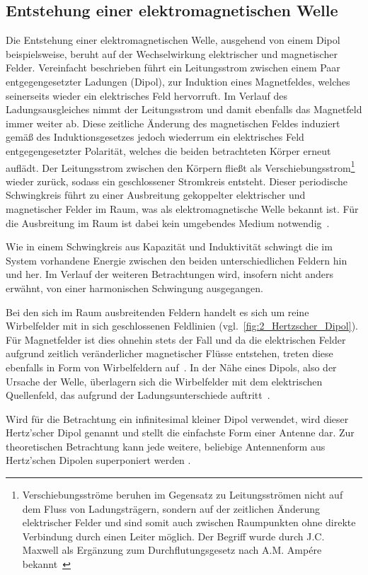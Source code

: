 
\subsection{Entstehung einer elektromagnetischen Welle}\label{cha:2_sub_Entstehung_einer_Welle}

Die Entstehung einer elektromagnetischen Welle, ausgehend von einem Dipol beispielsweise, beruht auf der Wechselwirkung elektrischer und magnetischer Felder. Vereinfacht beschrieben führt ein Leitungsstrom zwischen einem Paar entgegengesetzter Ladungen (Dipol), zur Induktion eines Magnetfeldes, welches seinerseits wieder ein elektrisches Feld hervorruft. Im Verlauf des Ladungsausgleiches nimmt der Leitungsstrom und damit ebenfalls das Magnetfeld immer weiter ab. Diese zeitliche Änderung des magnetischen Feldes induziert gemäß des Induktionsgesetzes jedoch wiederrum ein elektrisches Feld entgegengesetzter Polarität, welches die beiden betrachteten Körper erneut auflädt. Der Leitungsstrom zwischen den Körpern fließt als Verschiebungsstrom\footnote{Verschiebungsströme beruhen im Gegensatz zu Leitungsströmen nicht auf dem Fluss von Ladungsträgern, sondern auf der zeitlichen Änderung elektrischer Felder und sind somit auch zwischen Raumpunkten ohne direkte Verbindung durch einen Leiter möglich. Der Begriff wurde durch J.C. Maxwell als Ergänzung zum Durchflutungsgesetz nach A.M. Ampére bekannt~\cite{Feldtheorie_Begriffe}} wieder zurück, sodass ein geschlossener Stromkreis entsteht. Dieser periodische Schwingkreis führt zu einer Ausbreitung gekoppelter elektrischer und magnetischer Felder im Raum, was als elektromagnetische Welle bekannt ist. Für die Ausbreitung im Raum ist dabei kein umgebendes Medium notwendig~\cite{EM_Schirmung}.
\par
\vspace{\linespace}
Wie in einem Schwingkreis aus Kapazität und Induktivität schwingt die im System vorhandene Energie zwischen den beiden unterschiedlichen Feldern hin und her. Im Verlauf der weiteren Betrachtungen wird, insofern nicht anders erwähnt, von einer harmonischen Schwingung ausgegangen.
\par
\vspace{\linespace}
Bei den sich im Raum ausbreitenden Feldern handelt es sich um reine Wirbelfelder mit in sich geschlossenen Feldlinien \cite{Feldtheorie_Begriffe} (vgl.~\Abb\ref{fig:2_Hertzscher_Dipol}). Für Magnetfelder ist dies ohnehin stets der Fall und da die elektrischen Felder aufgrund zeitlich veränderlicher magnetischer Flüsse entstehen, treten diese ebenfalls in Form von Wirbelfeldern auf~\cite{EM_Schirmung, Feldtheorie_Begriffe}. In der Nähe eines Dipols, also der Ursache der Welle, überlagern sich die Wirbelfelder mit dem elektrischen Quellenfeld, das aufgrund der Ladungsunterschiede auftritt~\cite{EM_Schirmung}. 
\par
\vspace{\linespace}
Wird für die Betrachtung ein infinitesimal kleiner Dipol verwendet, wird dieser Hertz'scher Dipol genannt und stellt die einfachste Form einer Antenne dar. Zur theoretischen Betrachtung kann jede weitere, beliebige Antennenform aus Hertz'schen Dipolen superponiert werden \cite{EM_Schirmung}.

